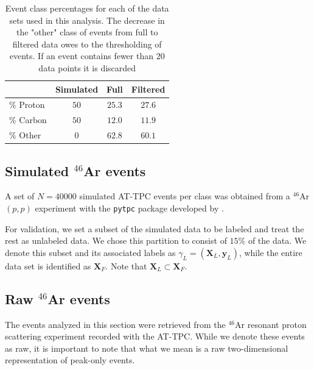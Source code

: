 \documentclass[review,number,sort&compress]{elsarticle}
\begin{document}
\begin{table}
\centering
\caption{Event class percentages for each of the data sets used in this analysis. The decrease in the "other" class of events from full to filtered data owes to the thresholding of events. If an event contains fewer than $20$ data points it is discarded }\label{tab:class_distr}
\begin{tabular}{lccc}
\toprule
{} & Simulated & Full & Filtered \\
\midrule
$\%$ Proton & $50$ & $25.3$ & $27.6$ \\ 
$\%$ Carbon & $50$ & $12.0$ & $11.9$ \\
$\%$ Other & $0$ & $62.8$ & $60.1$ \\
\end{tabular}
\end{table}

\subsection{Simulated \texorpdfstring{${}^{46}$Ar}{46Ar}  events}\label{sec:data_sim}

A set of $N=40000$ simulated AT-TPC events per class was obtained  from a ${}^{46}$Ar$(p, p)$ experiment with the \lstinline{pytpc} package developed by \citet{Bradt2017a}. %

For validation, we set a subset of the simulated data to be labeled and treat the rest as unlabeled data. We chose this partition to consist of  $15\%$ of the data. We denote this subset and its associated labels as $\gamma_L=(\boldsymbol{X}_L, \boldsymbol{y}_L)$, while the entire data set is identified as $\boldsymbol{X}_F$. Note that $\boldsymbol{X}_L \subset \boldsymbol{X}_F$.



\subsection{Raw \texorpdfstring{${}^{46}$Ar}{46Ar}  events}\label{sec:data_real}

The events analyzed in this section were retrieved from the ${}^{46}$Ar resonant proton scattering experiment recorded with the AT-TPC. 
While we denote these events as raw, it is important to note that what we mean is a raw two-dimensional representation of peak-only events.
\end{document}
